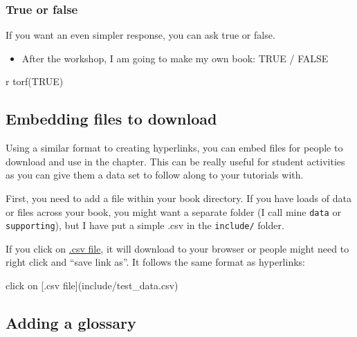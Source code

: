 \documentclass[
  letterpaper,
  DIV=11,
  numbers=noendperiod]{scrreprt}
\newenvironment{Shaded}{\begin{snugshade}}{\end{snugshade}}
\newcommand{\AttributeTok}[1]{\textcolor[rgb]{0.40,0.45,0.13}{#1}}
\newcommand{\NormalTok}[1]{\textcolor[rgb]{0.00,0.23,0.31}{#1}}
\newcommand{\SpecialCharTok}[1]{\textcolor[rgb]{0.37,0.37,0.37}{#1}}
\newcommand{\StringTok}[1]{\textcolor[rgb]{0.13,0.47,0.30}{#1}}
\providecommand{\tightlist}{%
  \setlength{\itemsep}{0pt}\setlength{\parskip}{0pt}}\usepackage{longtable,booktabs,array}
\begin{document}
\subsubsection{True or false}\label{true-or-false}

If you want an even simpler response, you can ask true or false.

\begin{itemize}
\tightlist
\item
  After the workshop, I am going to make my own book: TRUE / FALSE
\end{itemize}

\begin{Shaded}
\begin{Highlighting}[]
\StringTok{\textasciigrave{}}\AttributeTok{r torf(TRUE)}\StringTok{\textasciigrave{}}
\end{Highlighting}
\end{Shaded}

\subsection{Embedding files to
download}\label{embedding-files-to-download}

Using a similar format to creating hyperlinks, you can embed files for
people to download and use in the chapter. This can be really useful for
student activities as you can give them a data set to follow along to
your tutorials with.

First, you need to add a file within your book directory. If you have
loads of data or files across your book, you might want a separate
folder (I call mine \texttt{data} or \texttt{supporting}), but I have
put a simple .csv in the \texttt{include/} folder.

If you click on \href{include/test_data.csv}{.csv file}, it will
download to your browser or people might need to right click and ``save
link as''. It follows the same format as hyperlinks:

\begin{Shaded}
\begin{Highlighting}[]
\NormalTok{click on [.csv file](include}\SpecialCharTok{/}\NormalTok{test\_data.csv)}
\end{Highlighting}
\end{Shaded}

\subsection{Adding a glossary}\label{adding-a-glossary}
\end{document}
